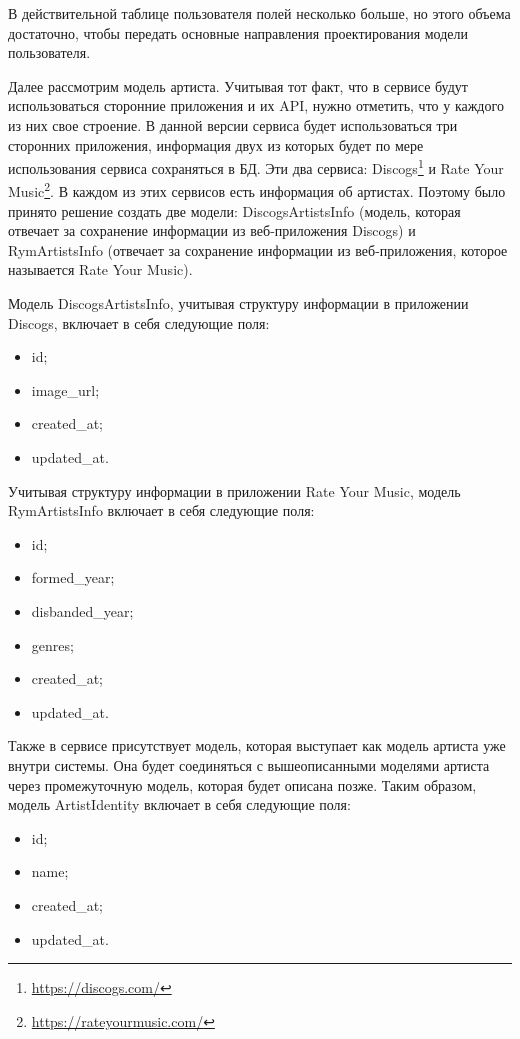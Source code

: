 В действительной таблице пользователя полей несколько больше, но этого объема достаточно, чтобы передать основные направления проектирования модели пользователя.

Далее рассмотрим модель артиста. Учитывая тот факт, что в сервисе будут использоваться сторонние приложения и их API, нужно отметить, что у каждого из них свое строение. В данной версии сервиса будет использоваться три сторонних приложения, информация двух из которых будет по мере использования сервиса сохраняться в БД. Эти два сервиса: Discogs\footnote{\url{https://discogs.com/}} и Rate Your Music\footnote{\url{https://rateyourmusic.com/}}. В каждом из этих сервисов есть информация об артистах. Поэтому было принято решение создать две модели: DiscogsArtistsInfo (модель, которая отвечает за сохранение информации из веб-приложения Discogs) и RymArtistsInfo (отвечает за сохранение информации из веб-приложения, которое называется Rate Your Music).

Модель DiscogsArtistsInfo, учитывая структуру информации в приложении Discogs, включает в себя следующие поля:

\begin{itemize}
  \item id;
  \item image\_url;
  \item created\_at;
  \item updated\_at.
\end{itemize}

Учитывая структуру информации в приложении Rate Your Music, модель RymArtistsInfo включает в себя следующие поля:

\begin{itemize}
  \item id;
  \item formed\_year;
  \item disbanded\_year;
  \item genres;
  \item created\_at;
  \item updated\_at.
\end{itemize}

Также в сервисе присутствует модель, которая выступает как модель артиста уже внутри системы. Она будет соединяться с вышеописанными моделями артиста через промежуточную модель, которая будет описана позже. Таким образом, модель ArtistIdentity включает в себя следующие поля:

\begin{itemize}
  \item id;
  \item name;
  \item created\_at;
  \item updated\_at.
\end{itemize}

